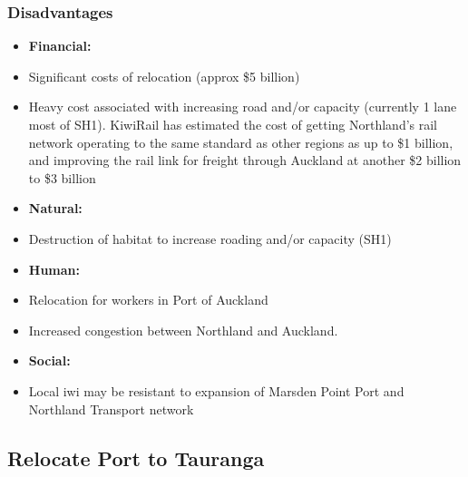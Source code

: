 \begin{multicols}{2}
    \subsubsection*{Disadvantages}
    \begin{itemize}[noitemsep]
        \item []\textbf{Financial: }
        \item{Significant costs of relocation (approx \$5 billion)}
        \item{Heavy cost associated with increasing road and/or capacity (currently 1 lane most of SH1).
        KiwiRail has estimated the cost of getting Northland’s rail network operating to the same standard as other regions as up to \$1 billion, and improving the rail link for freight through Auckland at another \$2 billion to \$3 billion}
        \item []\textbf{Natural: }
        \item{Destruction of habitat to increase roading and/or capacity (SH1)}
        \item []\textbf{Human: }
        \item{Relocation for workers in Port of Auckland}
        \item{Increased congestion between Northland and Auckland.}
        \item []\textbf{Social: }
        \item{Local iwi may be resistant to expansion of Marsden Point Port and Northland Transport network}
    \end{itemize}
 
\subsection*{Relocate Port to Tauranga}
  

\end{multicols}

